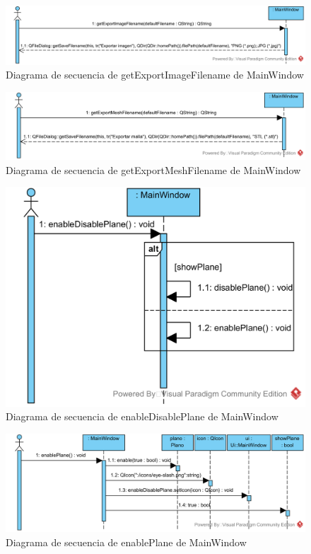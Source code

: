 \begin{figure}[H]
	\centering
	\includegraphics[width=12cm]{imagenes/diagramas/secuencia/MainWindow_GetExportImageFilename}
	\caption{Diagrama de secuencia de getExportImageFilename de MainWindow}
	\label{fig:diagrama_secuencia_mainWindow_getExportImageFilename}
\end{figure}

\begin{figure}[H]
	\centering
	\includegraphics[width=12cm]{imagenes/diagramas/secuencia/MainWindow_GetExportMeshFilename}
	\caption{Diagrama de secuencia de getExportMeshFilename de MainWindow}
	\label{fig:diagrama_secuencia_mainWindow_getExportMeshFilename}
\end{figure}

\begin{figure}[H]
	\centering
	\includegraphics[width=12cm]{imagenes/diagramas/secuencia/MainWindow_EnableDisablePlane}
	\caption{Diagrama de secuencia de enableDisablePlane de MainWindow}
	\label{fig:diagrama_secuencia_mainWindow_enableDisablePlane}
\end{figure}

\begin{figure}[H]
	\centering
	\includegraphics[width=12cm]{imagenes/diagramas/secuencia/MainWindow_EnablePlane}
	\caption{Diagrama de secuencia de enablePlane de MainWindow}
	\label{fig:diagrama_secuencia_mainWindow_enablePlane}
\end{figure}

